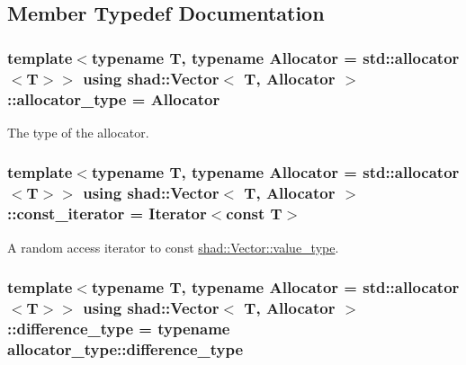 \subsection{Member Typedef Documentation}
\hypertarget{classshad_1_1Vector_ad950d846edeeed7cc4a9163f9f679624}{
\subsubsection[{allocator\-\_\-type}]{\setlength{\rightskip}{0pt plus 5cm}template$<$typename T, typename Allocator = std\-::allocator$<$\-T$>$$>$ using {\bf shad\-::\-Vector}$<$ T, Allocator $>$\-::{\bf allocator\-\_\-type} =  Allocator}}\label{classshad_1_1Vector_ad950d846edeeed7cc4a9163f9f679624}


The type of the allocator. 

\hypertarget{classshad_1_1Vector_ab677e6f62431a450c856e7ffe44efbc6}{
\subsubsection[{const\-\_\-iterator}]{\setlength{\rightskip}{0pt plus 5cm}template$<$typename T, typename Allocator = std\-::allocator$<$\-T$>$$>$ using {\bf shad\-::\-Vector}$<$ T, Allocator $>$\-::{\bf const\-\_\-iterator} =  Iterator$<$const T$>$}}\label{classshad_1_1Vector_ab677e6f62431a450c856e7ffe44efbc6}


A random access iterator to const \hyperlink{classshad_1_1Vector_adb97b89826617473f44b4bb1dd3308ba}{shad\-::\-Vector\-::value\-\_\-type}. 

\hypertarget{classshad_1_1Vector_a46e5348988a063d58ed55c76fc94cec1}{
\subsubsection[{difference\-\_\-type}]{\setlength{\rightskip}{0pt plus 5cm}template$<$typename T, typename Allocator = std\-::allocator$<$\-T$>$$>$ using {\bf shad\-::\-Vector}$<$ T, Allocator $>$\-::{\bf difference\-\_\-type} =  typename allocator\-\_\-type\-::difference\-\_\-type}}\label{classshad_1_1Vector_a46e5348988a063d58ed55c76fc94cec1}


